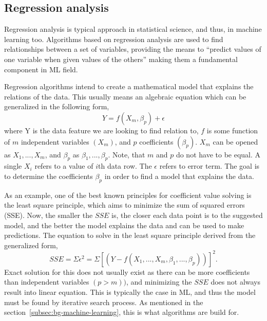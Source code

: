 
\subsection{Regression analysis}\label{subsec:bg-regression-ml}

Regression analysis is typical approach in statistical science,
and thus, in machine learning too.
Algorithms based on regression analysis
are used to find relationships between a set of variables,
providing the means to \enquote{predict values of one variable
when given values of the others}
making them a fundamental component in ML field.~\cite{merriam2022regression}

Regression algorithms intend to create a mathematical model
that explains the relations of the data.
This usually means an algebraic equation
which can be generalized in the following form,
\begin{equation}
    \label{eqn:general-regression-model}
    Y = f(X_{m},\beta_{p})+\epsilon
\end{equation}
where Y is the data feature we are looking to find relation to,
$f$ is some function of $m$ independent variables $(X_{m})$,
and $p$ coefficients $(\beta_{p})$.
$X_{m}$ can be opened as $X_{1},...,X_{m}$,
and $\beta_{p}$ as $\beta_{1},...,\beta_{p}$.
Note, that $m$ and $p$ do not have to be equal.
A single $X_{i}$ refers to a value of $i$th data row.
The $\epsilon$ refers to error term.
The goal is to determine the coefficients $\beta_{p}$
in order to find a model that explains the data.~\cite{freund2006regression}

As an example,
one of the best known principles for coefficient value solving
is the least square principle,
which aims to minimize the sum of squared errors (SSE).
Now,
the smaller the $SSE$ is,
the closer each data point is to the suggested model,
and the better the model explains the data
and can be used to make predictions.
The equation to solve in the least square principle
derived from the generalized form,
\begin{equation}
    \label{eqn:sum-of-squared-errors}
    SSE = \Sigma\epsilon^{2} = \Sigma[(Y-f(X_{1},...,X_{m},\beta_{1},...,\beta_{p}))]^{2}.
\end{equation}
Exact solution for this does not usually exist
as there can be more coefficients than independent variables $(p>m))$,
and minimizing the $SSE$ does not always result into linear equation.
This is typically the case in ML,
and thus the model must be found
by iterative search process.
As mentioned in the section~\ref{subsec:bg-machine-learning},
this is what algorithms are build for.

